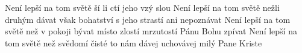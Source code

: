 \begin{TEXT}{Není lepší na tom světě}
\SLOKA {} ší   li  ctí \NL
jeho vzý  slou  
\SLOKA Není lepší na tom světě nežli druhým dávat \NL
však bohatství s jeho strastí ani nepoznávat 
\SLOKA Není lepší na tom světě než v pokoji bývat \NL
místo zlostí mrzutostí Pánu Bohu zpívat 
\SLOKA Není lepší na tom světě než svědomí čisté \NL
to nám dávej uchovávej milý Pane Kriste \NL
\end{TEXT}
